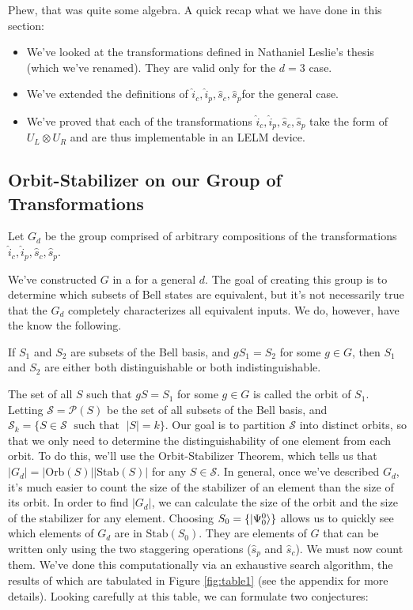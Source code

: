 Phew, that was quite some algebra. A quick recap what we have done in this section:
\begin{itemize}
  \item We've looked at the transformations defined in Nathaniel Leslie's thesis (which we've renamed). They are valid only for the $d=3$ case.
  \item We've extended the definitions of $\hat{i}_c, \hat{i}_p,\hat{s}_c, \hat{s}_p$for the general \quidit case.
  \item We've proved that each of the transformations $\hat{i}_c, \hat{i}_p,\hat{s}_c, \hat{s}_p$ take the form of $U_L \otimes U_R$ and are thus implementable in an LELM device.
\end{itemize}


\subsection{Orbit-Stabilizer on our Group of Transformations}

Let $G_d$ be the group comprised of arbitrary compositions of the transformations $\hat{i}_c, \hat{i}_p,\hat{s}_c, \hat{s}_p$.

We've constructed $G$ in a for a general $d$. The goal of creating this group is to determine which subsets of Bell states are equivalent, but it's not necessarily true that the $G_d$ completely characterizes all equivalent inputs. We do, however, have the know the following.
\begin{theorem}
  If $S_1$ and $S_2$ are subsets of the Bell basis, and $g S_1 = S_2$ for some $g \in G$, then $S_1$ and $S_2$ are either both distinguishable or both indistinguishable. 
\end{theorem}
The set of all $S$ such that $gS = S_1$ for some $g \in G$ is called the orbit of $S_1$. Letting $\mathcal{S} = \mathcal{P}(S)$ be the set of all subsets of the Bell basis, and $\mathcal{S}_k = \{S \in \mathcal{S} \; \text{ such that } \; |S| = k\}$. Our goal is to partition $\mathcal{S}$ into distinct orbits, so that we only need to determine the distinguishability of one element from each orbit. To do this, we'll use the Orbit-Stabilizer Theorem, which tells us that $|G_d| = |\text{Orb}(S)| |\text{Stab}(S)|$ for any $S \in \mathcal{S}$. In general, once we've described $G_d$, it's much easier to count the size of the stabilizer of an element than the size of its orbit. In order to find $|G_d|$, we can calculate the size of the orbit and the size of the stabilizer for any element. Choosing $S_0 = \{| \Psi_0^0 \rangle\}$ allows us to quickly see which elements of $G_d$ are in $\text{Stab}(S_0)$. They are elements of $G$ that can be written only using the two staggering operations ($\hat{s}_p$ and $\hat{s}_c$). We must now count them. We've done this computationally via an exhaustive search algorithm, the results of which are tabulated in Figure \ref{fig:table1} (see the appendix for more details). Looking carefully at this table, we can formulate two conjectures:

